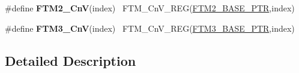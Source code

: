 \begin{DoxyCompactItemize}
\item 
\hypertarget{group___f_t_m___register___accessor___macros_gaade79f672ad080d530a40665a662cd0f}{}\#define {\bfseries F\+T\+M2\+\_\+\+Cn\+V}(index)                                                ~F\+T\+M\+\_\+\+Cn\+V\+\_\+\+R\+E\+G(\hyperlink{group___f_t_m___peripheral_ga897564efeaf1be1f991305d294eda3d6}{F\+T\+M2\+\_\+\+B\+A\+S\+E\+\_\+\+P\+T\+R},index)\label{group___f_t_m___register___accessor___macros_gaade79f672ad080d530a40665a662cd0f}

\item 
\hypertarget{group___f_t_m___register___accessor___macros_ga699bccf002ece2b859af1ddd47f21e0b}{}\#define {\bfseries F\+T\+M3\+\_\+\+Cn\+V}(index)                                                ~F\+T\+M\+\_\+\+Cn\+V\+\_\+\+R\+E\+G(\hyperlink{group___f_t_m___peripheral_ga32dd0c357080d5680c0c5b3cf821adab}{F\+T\+M3\+\_\+\+B\+A\+S\+E\+\_\+\+P\+T\+R},index)\label{group___f_t_m___register___accessor___macros_ga699bccf002ece2b859af1ddd47f21e0b}

\end{DoxyCompactItemize}


\subsection{Detailed Description}
